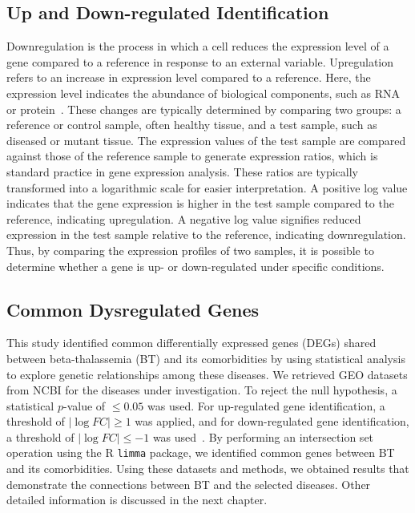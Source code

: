 \subsection{Up and Down-regulated Identification}
\label{sec:sec3_4_6}

Downregulation is the process in which a cell reduces the expression level of a gene compared to a reference in response to an external variable. Upregulation refers to an increase in expression level compared to a reference. Here, the expression level indicates the abundance of biological components, such as RNA or protein~\cite{updown_reg_ref}. These changes are typically determined by comparing two groups: a reference or control sample, often healthy tissue, and a test sample, such as diseased or mutant tissue. The expression values of the test sample are compared against those of the reference sample to generate expression ratios, which is standard practice in gene expression analysis. These ratios are typically transformed into a logarithmic scale for easier interpretation. A positive log value indicates that the gene expression is higher in the test sample compared to the reference, indicating upregulation. A negative log value signifies reduced expression in the test sample relative to the reference, indicating downregulation. Thus, by comparing the expression profiles of two samples, it is possible to determine whether a gene is up- or down-regulated under specific conditions.


\vspace*{-\parskip}
\subsection{Common Dysregulated Genes}
\label{sec:common_degs}

This study identified common differentially expressed genes (DEGs) shared between beta-thalassemia (BT) and its comorbidities by using statistical analysis to explore genetic relationships among these diseases. We retrieved GEO datasets from NCBI for the diseases under investigation. To reject the null hypothesis, a statistical \( p \)-value of \( \leq 0.05 \) was used. For up-regulated gene identification, a threshold of \( |\log FC| \geq 1 \) was applied, and for down-regulated gene identification, a threshold of \( |\log FC| \leq -1 \) was used~\cite{common_deg_ref}. By performing an intersection set operation using the R \texttt{limma} package, we identified common genes between BT and its comorbidities. Using these datasets and methods, we obtained results that demonstrate the connections between BT and the selected diseases. Other detailed information is discussed in the next chapter.

